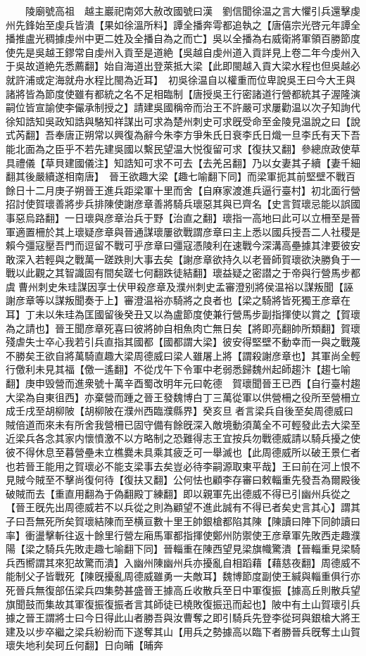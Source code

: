 　　陵廟號高祖　越主巖祀南郊大赦改國號曰漢　劉信聞徐温之言大懼引兵還擊虔州先鋒始至虔兵皆潰【果如徐溫所料】譚全播奔雩都追執之【唐僖宗光啓元年譚全播推盧光稠據虔州中更二姓及全播自為之而亡】吳以全播為右威衛將軍領百勝節度使先是吳越王鏐常自虔州入貢至是道絶【吳越自虔州道入貢詳見上卷二年今虔州入于吳故道絶先悉薦翻】始自海道出登萊抵大梁【此即閩越入貢大梁水程也但吳越必就許浦或定海就舟水程比閩為近耳】　初吳徐温自以權重而位卑說吳王曰今大王與諸將皆為節度使雖有都統之名不足相臨制【唐授吳王行密諸道行營都統其子渥隆演嗣位皆宣諭使李儼承制授之】請建吳國稱帝而治王不許嚴可求屢勸温以次子知詢代徐知誥知吳政知誥與駱知祥謀出可求為楚州刺史可求旣受命至金陵見温說之曰【說式芮翻】吾奉唐正朔常以興復為辭今朱李方爭朱氏日衰李氏日熾一旦李氏有天下吾能北面為之臣乎不若先建吳國以繫民望温大悦復留可求【復扶又翻】參總庶政使草具禮儀【草貝建國儀注】知誥知可求不可去【去羌呂翻】乃以女妻其子續【妻千細翻其後嚴續遂相南唐】　晉王欲趣大梁【趣七喻翻下同】而梁軍扼其前堅壁不戰百餘日十二月庚子朔晉王進兵距梁軍十里而舍【自麻家渡進兵逼行臺村】初北面行營招討使賀瓌善將步兵排陳使謝彦章善將騎兵瓌惡其與已齊名【史言賀瓌忌能以誤國事惡烏路翻】一日瓌與彦章治兵于野【治直之翻】瓌指一高地曰此可以立柵至是晉軍適置柵於其上瓌疑彦章與晉通謀瓌屢欲戰謂彦章曰主上悉以國兵授吾二人社稷是賴今彊寇壓吾門而逗留不戰可乎彦章曰彊寇憑陵利在速戰今深溝高壘據其津要彼安敢深入若輕與之戰萬一蹉跌則大事去矣【謝彦章欲持久以老晉師賀瓌欲決勝負于一戰以此觀之其智識固有間矣蹉七何翻跌徒結翻】瓌益疑之密譛之于帝與行營馬步都虞曹州刺史朱珪謀因享士伏甲殺彦章及濮州刺史孟審澄别將侯温裕以謀叛聞【誣謝彦章等以謀叛聞奏于上】審澄温裕亦騎將之良者也【梁之騎將皆死獨王彦章在耳】丁未以朱珪為匡國留後癸丑又以為盧節度使兼行營馬步副指揮使以賞之【賀瓌為之請也】晉王聞彦章死喜曰彼將帥自相魚肉亡無日矣【將即亮翻帥所類翻】賀瓌殘虐失士卒心我若引兵直指其國都【國都謂大梁】彼安得堅壁不動幸而一與之戰蔑不勝矣王欲自將萬騎直趣大梁周德威曰梁人雖屠上將【謂殺謝彦章也】其軍尚全輕行儌利未見其福【儌一遙翻】不從戊午下令軍中老弱悉歸魏州起師趨汴【趨七喻翻】庚申毁營而進衆號十萬辛酉蜀改明年元曰乾德　賀瓌聞晉王已西【自行臺村趨大梁為自東徂西】亦棄營而踵之晉王發魏博白丁三萬從軍以供營柵之役所至營柵立成壬戌至胡柳陂【胡柳陂在濮州西臨濮縣界】癸亥旦者言梁兵自後至矣周德威曰賊倍道而來未有所舍我營柵已固守備有餘旣深入敵境動須萬全不可輕發此去大梁至近梁兵各念其家内懷憤激不以方略制之恐難得志王宜按兵勿戰德威請以騎兵擾之使彼不得休息至暮營壘未立樵爨未具乘其疲乏可一舉滅也【此周德威所以破王景仁者也若晉王能用之賀瓌必不能支梁事去矣豈必待李嗣源取東平哉】王曰前在河上恨不見賊今賊至不擊尚復何待【復扶又翻】公何怯也顧李存審曰敕輜重先發吾為爾殿後破賊而去【重直用翻為于偽翻殿丁練翻】即以親軍先出德威不得已引幽州兵從之【晉王旣先出周德威若不以兵從之則為顧望不進此誠有不得已者矣史言其心】謂其子曰吾無死所矣賀瓌結陳而至横亘數十里王帥銀槍都陷其陳【陳讀曰陣下同帥讀曰率】衝盪擊斬往返十餘里行營左廂馬軍都指揮使鄭州防禦使王彦章軍先敗西走趣濮陽【梁之騎兵先敗走趣七喻翻下同】晉輜重在陳西望見梁旗幟驚潰【晉輜重見梁騎兵西嚮謂其來犯故驚而潰】入幽州陳幽州兵亦擾亂自相蹈藉【藉慈夜翻】周德威不能制父子皆戰死【陳旣擾亂周德威雖勇一夫敵耳】魏博節度副使王緘與輜重俱行亦死晉兵無復部伍梁兵四集勢甚盛晉王據高丘收散兵至日中軍復振【據高丘則散兵望旗聞鼓而集故其軍復振復振者言其師徒已橈敗復振迅而起也】陂中有土山賀瓌引兵據之晉王謂將士曰今日得此山者勝吾與汝曹奪之即引騎兵先登李從珂與銀槍大將王建及以步卒繼之梁兵紛紛而下遂奪其山【用兵之勢據高以臨下者勝晉兵旣奪土山賀瓌失地利矣珂丘何翻】日向晡【晡奔
